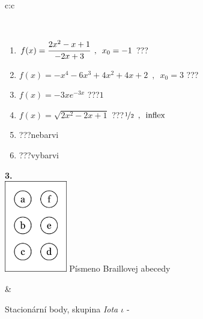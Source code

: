 \documentclass[10pt]{report}
\begin{document}
\begin{tabular}{c:c}
\begin{minipage}[c][104.5mm][t]{0.5\linewidth}
\begin{center}
\begin{minipage}{0.95\linewidth}
\begin{center}
\end{center}
\end{minipage}
\\[1mm]
\begin{minipage}{0.79\linewidth}
\begin{center}
\begin{varwidth}{\linewidth}
\begin{enumerate}
\normalsize
\item $f(x)=\cfrac{2x^2-x+1}{-2x+3}\enspace , \enspace x_0=-1$\quad \dotfill\; ???\;\dotfill \quad {}
\item $f(x)=-x^4-6x^3+4x^2+4x+2\enspace , \enspace x_0=3$\quad \dotfill\; ???\;\dotfill \quad {}
\item $f(x)=-3xe^{-3x}$\quad \dotfill\; ???\;\dotfill \quad $1$
\item $f(x)=\sqrt{2x^2-2x+1}$\quad \dotfill\; ???\;\dotfill \quad $\nicefrac{1}{2}\enspace , \enspace\mathrm{inflex}$
\item \quad \dotfill\; ???\;\dotfill \quad nebarvi
\item \quad \dotfill\; ???\;\dotfill \quad vybarvi
\end{enumerate}
\end{varwidth}
\end{center}
\end{minipage}
\begin{minipage}{0.20\linewidth}
\begin{center}
{\Huge\bfseries 3.} \\[2mm]
\includegraphics[height=40mm]{../images/braille.png}
{\small Písmeno Braillovej abecedy}
\end{center}
\end{minipage}
\end{center}
\end{minipage}
&
\begin{minipage}[c][104.5mm][t]{0.5\linewidth}
\begin{center}
\vspace{7mm}
{\huge Stacionární body, skupina \textit{Iota $\iota$} -}\\[5mm]

\end{center}
\end{minipage}
\end{tabular}
\end{document}
